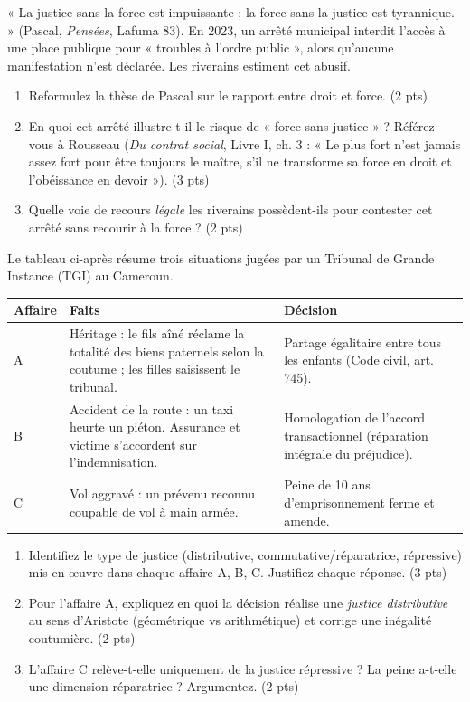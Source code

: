 \documentclass[11pt]{article}
\begin{document}
\begin{exercice}
« La justice sans la force est impuissante ; la force sans la justice est tyrannique. » (Pascal, \textit{Pensées}, Lafuma 83). En 2023, un arrêté municipal interdit l'accès à une place publique pour « troubles à l'ordre public », alors qu'aucune manifestation n'est déclarée. Les riverains estiment cet abusif.
\begin{enumerate}
    \item Reformulez la thèse de Pascal sur le rapport entre droit et force. (2 pts)
    \item En quoi cet arrêté illustre-t-il le risque de « force sans justice » ? Référez-vous à Rousseau (\textit{Du contrat social}, Livre I, ch. 3 : « Le plus fort n'est jamais assez fort pour être toujours le maître, s'il ne transforme sa force en droit et l'obéissance en devoir »). (3 pts)
    \item Quelle voie de recours \textit{légale} les riverains possèdent-ils pour contester cet arrêté sans recourir à la force ? (2 pts)
\end{enumerate}
\end{exercice}

\begin{exercice}
Le tableau ci-après résume trois situations jugées par un Tribunal de Grande Instance (TGI) au Cameroun.
\begin{center}
\begin{tabular}{|p{2.5cm}|p{5cm}|p{4.5cm}|}
\hline
\textbf{Affaire} & \textbf{Faits} & \textbf{Décision} \\ \hline
A & Héritage : le fils aîné réclame la totalité des biens paternels selon la coutume ; les filles saisissent le tribunal. & Partage égalitaire entre tous les enfants (Code civil, art. 745). \\ \hline
B & Accident de la route : un taxi heurte un piéton. Assurance et victime s'accordent sur l'indemnisation. & Homologation de l'accord transactionnel (réparation intégrale du préjudice). \\ \hline
C & Vol aggravé : un prévenu reconnu coupable de vol à main armée. & Peine de 10 ans d'emprisonnement ferme et amende. \\ \hline
\end{tabular}
\end{center}
\begin{enumerate}
    \item Identifiez le type de justice (distributive, commutative/réparatrice, répressive) mis en œuvre dans chaque affaire A, B, C. Justifiez chaque réponse. (3 pts)
    \item Pour l'affaire A, expliquez en quoi la décision réalise une \textit{justice distributive} au sens d'Aristote (géométrique vs arithmétique) et corrige une inégalité coutumière. (2 pts)
    \item L'affaire C relève-t-elle uniquement de la justice répressive ? La peine a-t-elle une dimension réparatrice ? Argumentez. (2 pts)
\end{enumerate}
\end{exercice}
\end{document}
